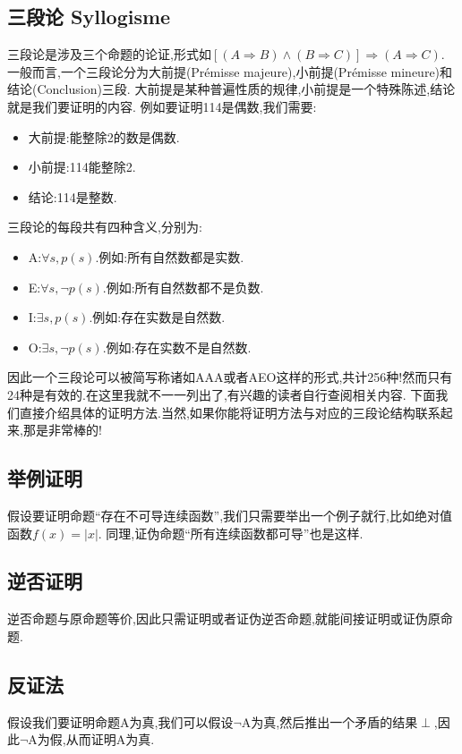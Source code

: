 \documentclass[12pt, a4paper, oneside]{ctexbook}
\begin{document}
  \subsection{三段论 Syllogisme}
  三段论是涉及三个命题的论证,形式如$[(A\Rightarrow B)\land (B\Rightarrow C)]\Rightarrow (A\Rightarrow C)$.
  一般而言,一个三段论分为大前提(Prémisse majeure),小前提(Prémisse mineure)和结论(Conclusion)三段.
  大前提是某种普遍性质的规律,小前提是一个特殊陈述,结论就是我们要证明的内容.
  例如要证明114是偶数,我们需要:\begin{itemize}
    \item 大前提:能整除2的数是偶数.
    \item 小前提:114能整除2.
    \item 结论:114是整数.
  \end{itemize}
  三段论的每段共有四种含义,分别为:
  \begin{itemize}
    \item A:$\forall s,p(s)$.例如:所有自然数都是实数.
    \item E:$\forall s,\lnot p(s)$.例如:所有自然数都不是负数.
    \item I:$\exists s,p(s)$.例如:存在实数是自然数.
    \item O:$\exists s,\lnot p(s)$.例如:存在实数不是自然数.
  \end{itemize}
  因此一个三段论可以被简写称诸如AAA或者AEO这样的形式,共计256种!然而只有24种是有效的.在这里我就不一一列出了,有兴趣的读者自行查阅相关内容.
  下面我们直接介绍具体的证明方法.当然,如果你能将证明方法与对应的三段论结构联系起来,那是非常棒的!

  \subsection{举例证明}
  假设要证明命题“存在不可导连续函数”,我们只需要举出一个例子就行,比如绝对值函数$f(x)=|x|$.
  同理,证伪命题“所有连续函数都可导”也是这样.
  \subsection{逆否证明}
  逆否命题与原命题等价,因此只需证明或者证伪逆否命题,就能间接证明或证伪原命题.
  \subsection{反证法}
  假设我们要证明命题A为真,我们可以假设$\lnot $A为真,然后推出一个矛盾的结果$\perp $,因此$\lnot $A为假,从而证明A为真.\\
  
\end{document}
